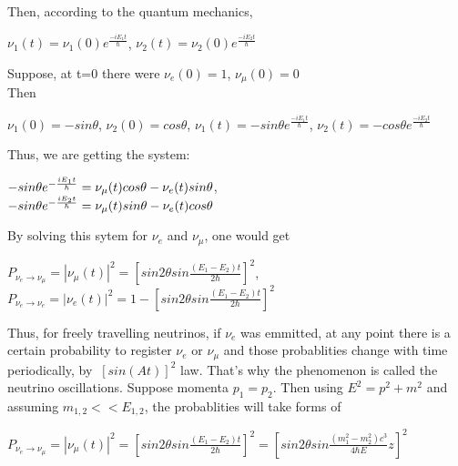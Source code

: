 Then, according to the quantum mechanics,\\
\begin{center}
$\nu_1(t)=\nu_1(0)e^{\frac{-iE_1t}{\hbar}}$, $\nu_2(t)=\nu_2(0)e^{\frac{-iE_2t}{\hbar}}$\\
\end{center}

Suppose, at t=0 there were $\nu_e(0)=1$, $\nu_\mu(0)=0$\\
Then 
\begin{center}
$\nu_1(0)=-sin\theta$, $\nu_2(0)=cos\theta$, $\nu_1(t)=-{sin\theta}e^{\frac{-iE_1t}{\hbar}}$, $\nu_2(t)=-{cos\theta}e^{\frac{-iE_2t}{\hbar}}$\\
\end{center}

Thus, we are getting the system:\\
\begin{center}
$-{sin\theta}e^{-{{iE_1t} \over \hbar}}=\nu_\mu(t)cos\theta-\nu_e(t)sin\theta$,\\
$-{sin\theta}e^{-{{iE_2t} \over \hbar}}=\nu_\mu(t)sin\theta-\nu_e(t)cos\theta$\\
\end{center}

By solving this sytem for $\nu_e$ and $\nu_\mu$, one would get\\
\begin{center}
$P_{\nu_e \rightarrow \nu_\mu}=|\nu_\mu(t)|^2=[{sin2\theta}sin{\frac{(E_1-E_2)t}{2\hbar}}]^2$,\\
$P_{\nu_e \rightarrow \nu_e}=|\nu_e(t)|^2=1-[{sin2\theta}sin{\frac{(E_1-E_2)t}{2\hbar}}]^2$\\
\end{center}

Thus, for freely travelling neutrinos, if $\nu_e$ was emmitted, at any point there is a certain probability to register $\nu_e$ or $\nu_\mu$ and those probablities change with time periodically, by $~[sin(At)]^2$ law. That's why the phenomenon is called the neutrino oscillations.
Suppose momenta $p_1=p_2$. Then using $E^2=p^2+m^2$ and assuming $m_{1,2}<<E_{1,2}$, the probablities will take forms of\\
\begin{center}
$P_{\nu_e \rightarrow \nu_\mu}=|\nu_\mu(t)|^2=[{sin2\theta}sin{\frac{(E_1-E_2)t}{2\hbar}}]^2=[{sin2\theta}sin{\frac{(m_1^2-m_2^2)c^3}{4\hbar{E}}z}]^2$\\  
\end{center}

